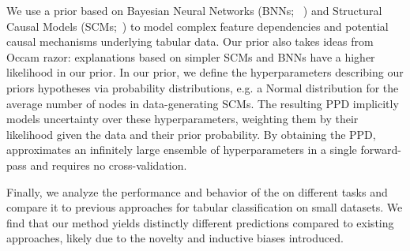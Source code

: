 We use a prior based on Bayesian Neural Networks (BNNs; ~\citealt{neal-bayes96a,gal-phdthesis16a}) and Structural Causal Models (SCMs;~\citealt{pearl_2009,causalinferencelearningbook}) to model complex feature dependencies and potential causal mechanisms underlying tabular data.
Our prior also takes ideas from Occam razor: explanations based on simpler SCMs and BNNs have a higher likelihood in our prior.
In our prior, we define the hyperparameters describing our priors hypotheses via probability distributions, e.g. a Normal distribution for the average number of nodes in data-generating SCMs.
The resulting PPD implicitly models uncertainty over these hyperparameters, weighting them by their likelihood given the data and their prior probability.
By obtaining the PPD, \methodname{} approximates an infinitely large ensemble of hyperparameters in a single forward-pass and requires no cross-validation.

Finally, we analyze the performance and behavior of the \methodname{} on different tasks and compare it to previous approaches for tabular classification on small datasets. We find that our method yields distinctly different predictions compared to existing approaches, likely due to the novelty and inductive biases introduced.


